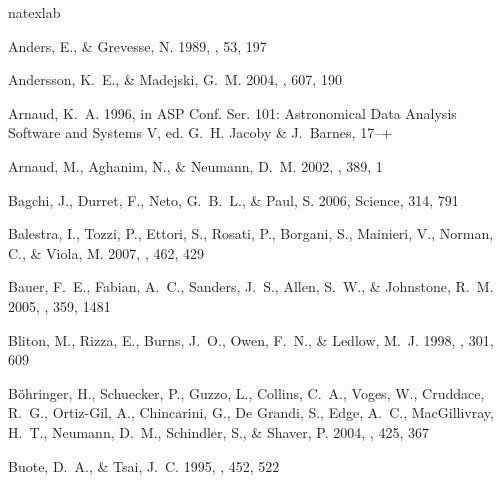 \documentclass[12pt,preprint]{aastex}
\begin{document}
\begin{thebibliography}{83}
\expandafter\ifx\csname natexlab\endcsname\relax\def\natexlab#1{#1}\fi

{Anders}, E., \& {Grevesse}, N. 1989, \gca, 53, 197

{Andersson}, K.~E., \& {Madejski}, G.~M. 2004, \apj, 607, 190

{Arnaud}, K.~A. 1996, in ASP Conf. Ser. 101: Astronomical Data Analysis
  Software and Systems V, ed. G.~H. {Jacoby} \& J.~{Barnes}, 17--+

{Arnaud}, M., {Aghanim}, N., \& {Neumann}, D.~M. 2002, \aap, 389, 1

{Bagchi}, J., {Durret}, F., {Neto}, G.~B.~L., \& {Paul}, S. 2006, Science, 314,
  791

{Balestra}, I., {Tozzi}, P., {Ettori}, S., {Rosati}, P., {Borgani}, S.,
  {Mainieri}, V., {Norman}, C., \& {Viola}, M. 2007, \aap, 462, 429

{Bauer}, F.~E., {Fabian}, A.~C., {Sanders}, J.~S., {Allen}, S.~W., \&
  {Johnstone}, R.~M. 2005, \mnras, 359, 1481

{Bliton}, M., {Rizza}, E., {Burns}, J.~O., {Owen}, F.~N., \& {Ledlow}, M.~J.
  1998, \mnras, 301, 609

{B{\"o}hringer}, H., {Schuecker}, P., {Guzzo}, L., {Collins}, C.~A., {Voges},
  W., {Cruddace}, R.~G., {Ortiz-Gil}, A., {Chincarini}, G., {De Grandi}, S.,
  {Edge}, A.~C., {MacGillivray}, H.~T., {Neumann}, D.~M., {Schindler}, S., \&
  {Shaver}, P. 2004, \aap, 425, 367

{Buote}, D.~A., \& {Tsai}, J.~C. 1995, \apj, 452, 522


\end{thebibliography}
\end{document}
